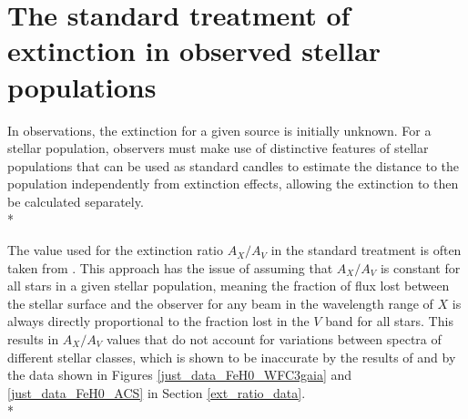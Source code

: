 \documentclass[12pt, a4paper]{report}
\begin{document}
\section{The standard treatment of extinction in observed stellar populations} \label{standard_ext}

In observations, the extinction for a given source is initially unknown. For a stellar population, observers must make use of distinctive features of stellar populations that can be used as standard candles to estimate the distance to the population independently from extinction effects, allowing the extinction to then be calculated separately. \\*

The value used for the extinction ratio $A_{X}/A_{V}$ in the standard treatment is often taken from \cite{1985ApJ...288..618R}. This approach has the issue of assuming that $A_{X}/A_{V}$ is constant for all stars in a given stellar population, meaning the fraction of flux lost between the stellar surface and the observer for any beam in the wavelength range of $X$ is always directly proportional to the fraction lost in the $V$ band for all stars. This results in  $A_{X}/A_{V}$ values that do not account for variations between spectra of different stellar classes, which is shown to be inaccurate by the results of \cite{2008PASP..120..583G} and by the data shown in Figures \ref{just_data_FeH0_WFC3gaia} and \ref{just_data_FeH0_ACS} in Section \ref{ext_ratio_data}.\\*
\end{document}
